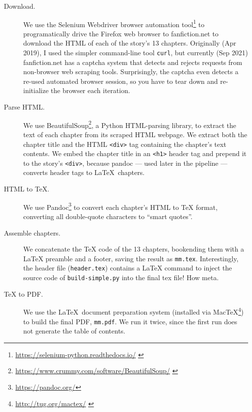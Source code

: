 \documentclass[ebook,12pt]{memoir}
\begin{document}
\begin{description}

\item[Download.] We use the Selenium Webdriver browser automation tool\footnote{
    \tiny{ \url{https://selenium-python.readthedocs.io/} }
} to programatically drive the Firefox web browser to fanfiction.net to
download the HTML of each of the story's 13 chapters. Originally (Apr 2019),
I used the simpler command-line tool \texttt{curl}, but currently (Sep 2021) fanfiction.net
has a captcha system that detects and rejects requests from non-browser web scraping tools.
Surprisingly, the captcha even detects a re-used automated browser session,
so you have to tear down and re-initialize the browser each iteration.

\item[Parse HTML.] We use BeautifulSoup\footnote{
    \tiny{ \url{https://www.crummy.com/software/BeautifulSoup/} }
}, a Python HTML-parsing library,
to extract the text of each chapter from its scraped HTML webpage.
We extract both the chapter title and the HTML \texttt{<div>} tag containing
the chapter's text contents. We embed the chapter title in an \texttt{<h1>} header tag
and prepend it to the story's \texttt{<div>}, because pandoc --- used later in the pipeline --- 
converts header tags to \LaTeX\ chapters. 

\item[HTML to TeX.] We use Pandoc\footnote{\tiny{\url{https://pandoc.org/}}} to convert
each chapter's HTML to TeX format, converting all double-quote characters to ``smart quotes''.

\item[Assemble chapters.] We concatenate the TeX code of the 13 chapters, bookending them with a
LaTeX preamble and a footer, saving the result as \texttt{mm.tex}. Interestingly, the header file (\texttt{header.tex})
contains a LaTeX command to inject the source code of \texttt{build-simple.py} into the final tex file! How meta.

\item[TeX to PDF.] We use the \LaTeX\ document preparation system (installed via MacTeX\footnote{
    \tiny{ \url{http://tug.org/mactex/} }
}) to build the final PDF, \texttt{mm.pdf}. We run it twice, since the first run does not
generate the table of contents.

\end{description}


\normalsize
\cleartorecto


\tableofcontents*  %

\mainmatter         %
\end{document}
